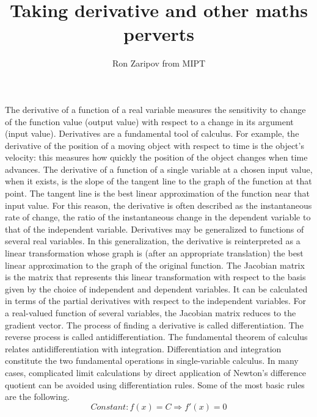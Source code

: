 \documentclass[12pt]{article}
\begin{document}
\title{Taking derivative and other maths perverts}
\author{Ron Zaripov from MIPT}
\maketitle
The derivative of a function of a real variable measures the sensitivity to change of the function value (output value) with respect to a change in its argument (input value). Derivatives are a fundamental tool of calculus. For example, the derivative of the position of a moving object with respect to time is the object's velocity: this measures how quickly the position of the object changes when time advances.
The derivative of a function of a single variable at a chosen input value, when it exists, is the slope of the tangent line to the graph of the function at that point. The tangent line is the best linear approximation of the function near that input value. For this reason, the derivative is often described as the instantaneous rate of change, the ratio of the instantaneous change in the dependent variable to that of the independent variable.
Derivatives may be generalized to functions of several real variables. In this generalization, the derivative is reinterpreted as a linear transformation whose graph is (after an appropriate translation) the best linear approximation to the graph of the original function. The Jacobian matrix is the matrix that represents this linear transformation with respect to the basis given by the choice of independent and dependent variables. It can be calculated in terms of the partial derivatives with respect to the independent variables. For a real-valued function of several variables, the Jacobian matrix reduces to the gradient vector.
\newline\newline 
The process of finding a derivative is called differentiation. The reverse process is called antidifferentiation. The fundamental theorem of calculus relates antidifferentiation with integration. Differentiation and integration constitute the two fundamental operations in single-variable calculus.\newline 
 \newline 
\bigskip {}\newline\newline\bigskip
In many cases, complicated limit calculations by direct application of Newton's difference quotient can be avoided using differentiation rules. Some of the most basic rules are the following.
$$Constant: f(x) = C \Longrightarrow  f'(x) = 0$$
\end{document}
